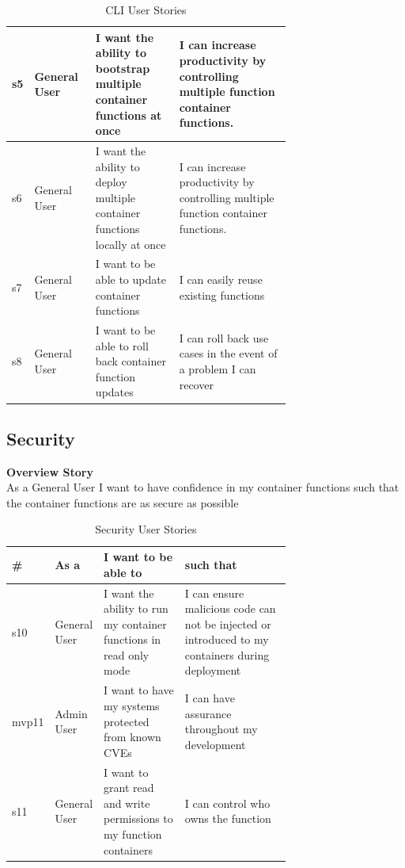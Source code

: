 \begin{table}[!ht]
\begin{tabular}{|l|l|p{0.3\linewidth}|p{0.4\linewidth}|}
s5          & General User  & I want the ability to bootstrap multiple container functions at once      & I can increase productivity by controlling multiple function container functions.                                                                        \\ \hline
s6          & General User  & I want the ability to deploy multiple container functions locally at once & I can increase productivity by controlling multiple function container functions.                                                                        \\ \hline
s7          & General User  & I want to be able to update container functions                           & I can easily reuse existing functions                                                           \\ \hline
s8          & General User  & I want to be able to roll back container function updates                 & I can roll back use cases in the event of a problem I can recover                                                           \\ \hline
\end{tabular}
\caption{CLI User Stories}
\label{tab:cli}
\end{table}
\clearpage

\subsection{Security}
\textbf{Overview Story}
\\As a General User I want to have confidence in my container functions such that the container functions are as secure as possible
\begin{table}[!ht]
\begin{tabular}{|l|l|p{0.3\linewidth}|p{0.4\linewidth}|}
\hline
\textbf{\#} & \textbf{As a} & \textbf{I want to be able to}                                        & \textbf{such that}                                                                               \\ \hline
s10         & General User  & I want the ability to run my container functions in read only mode   & I can ensure malicious code can not be injected or introduced to my containers during deployment \\ \hline
mvp11        & Admin User    & I want to have my systems protected from known CVEs                  & I can have assurance throughout my development                                                   \\ \hline
s11         & General User  & I want to grant read and write permissions to my function containers & I can control who owns the function                                                              \\ \hline
\end{tabular}
\caption{Security User Stories}
\label{tab:security}
\end{table}

